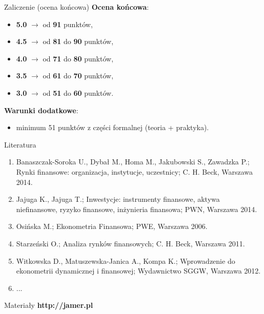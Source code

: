 \documentclass[a4paper, 11pt]{beamer}
\begin{document}
	\begin{frame}{Zaliczenie (ocena końcowa)}
		\textbf{Ocena końcowa}:
		\begin{itemize}
			\item \textbf{5.0} $\rightarrow$ od \textbf{91} punktów,
			\item \textbf{4.5} $\rightarrow$ od \textbf{81} do \textbf{90} punktów,
			\item \textbf{4.0} $\rightarrow$ od \textbf{71} do \textbf{80} punktów,
			\item \textbf{3.5} $\rightarrow$ od \textbf{61} do \textbf{70} punktów,
			\item \textbf{3.0} $\rightarrow$ od \textbf{51} do \textbf{60} punktów.
		\end{itemize}
		\textbf{Warunki dodatkowe}:
		\begin{itemize}
			\item minimum 51 punktów z części formalnej (teoria + praktyka).
		\end{itemize}
	\end{frame}
	
	\begin{frame}{Literatura}
		\begin{enumerate}
			\item Banaszczak-Soroka U., Dybał M., Homa M., Jakubowski S., Zawadzka P.; Rynki finansowe: organizacja, instytucje, uczestnicy; C. H. Beck, Warszawa 2014.
			\item Jajuga K., Jajuga T.; Inwestycje: instrumenty finansowe, aktywa niefinansowe, ryzyko finansowe, inżynieria finansowa; PWN, Warszawa 2014.
			\item Osińska M.; Ekonometria Finansowa; PWE, Warszawa 2006.
			\item Starzeński O.; Analiza rynków finansowych; C. H. Beck, Warszawa 2011.
			\item Witkowska D., Matuszewska-Janica A., Kompa K.; Wprowadzenie do ekonometrii dynamicznej i finansowej; Wydawnictwo SGGW, Warszawa 2012.
			\item ...
		\end{enumerate}
	\end{frame}
	
	\begin{frame}{Materiały}
		\Huge\bfseries
		\centering
		http://jamer.pl
	\end{frame}
\end{document}
